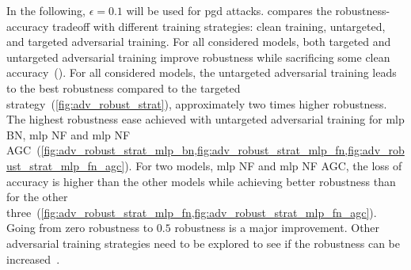 \documentclass[../main.tex]{subfiles}
\begin{document}
		In the following, \(\epsilon = 0.1\) will be used for \gls{pgd} attacks.
		 compares the robustness-accuracy tradeoff with different training strategies: clean training, untargeted, and targeted adversarial training.
		For all considered models, both targeted and untargeted adversarial training improve robustness while sacrificing some clean accuracy~().
		For all considered models, the untargeted adversarial training leads to the best robustness compared to the targeted strategy~(\cref{fig:adv_robust_strat}), approximately two times higher robustness.
		The highest robustness ease achieved with untargeted adversarial training for \gls{mlp} BN, \gls{mlp} NF and \gls{mlp} NF AGC~(\cref{fig:adv_robust_strat_mlp_bn,fig:adv_robust_strat_mlp_fn,fig:adv_robust_strat_mlp_fn_agc}).
		For two models, \gls{mlp} NF and \gls{mlp} NF AGC, the loss of accuracy is higher than the other models while achieving better robustness than for the other three~(\cref{fig:adv_robust_strat_mlp_fn,fig:adv_robust_strat_mlp_fn_agc}).
		Going from zero robustness to \(0.5\) robustness is a major improvement.
		Other adversarial training strategies need to be explored to see if the robustness can be increased~\cite{AdvTrainSurvey}.
\end{document}
